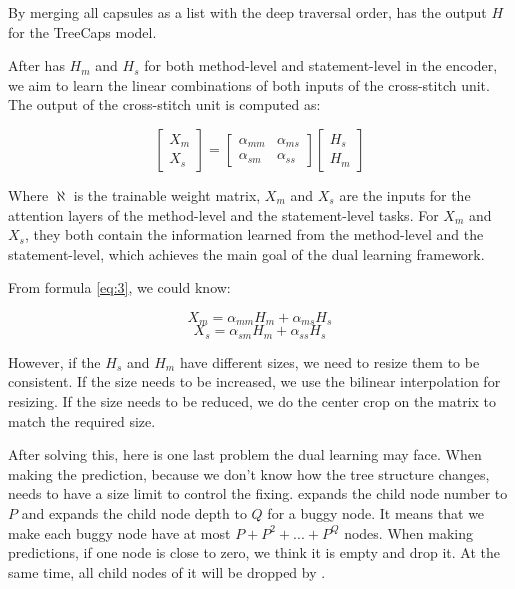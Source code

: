By merging all capsules as a list with the deep traversal order, \tool has the output $H$ for the TreeCaps model.

After \tool has $H_m$ and $H_s$ for both method-level and statement-level in the encoder, we aim to learn the linear combinations of both inputs of the cross-stitch unit. The output of the cross-stitch unit is computed as:

\begin{equation}\label{eq:3}
	\begin{bmatrix}
		X_m\\
		X_s
	\end{bmatrix}
	=
	\begin{bmatrix}
		\alpha_{mm} &  \alpha_{ms} \\
		\alpha_{sm} &  \alpha_{ss}
	\end{bmatrix}
	\begin{bmatrix}
		H_s\\
		H_m
	\end{bmatrix}
\end{equation}

Where $\aleph$ is the trainable weight matrix, $X_m$ and $X_s$ are the inputs for the attention layers of the method-level and the statement-level tasks. For $X_m$ and $X_s$, they both contain the information learned from the method-level and the statement-level, which achieves the main goal of the dual learning framework.

From formula \ref{eq:3}, we could know:

\begin{equation}\label{eq:4}
	X_m = \alpha_{mm}H_m + \alpha_{ms}H_s
\end{equation}
\begin{equation}\label{eq:5}
	X_s = \alpha_{sm}H_m + \alpha_{ss}H_s
\end{equation}

However, if the $H_s$ and $H_m$ have different sizes, we need to resize them to be consistent. If the size needs to be increased, we use the bilinear interpolation for resizing. If the size needs to be reduced, we do the center crop on the matrix to match the required size.

After solving this, here is one last problem the dual learning may face. When making the prediction, because we don't know how the tree structure changes, \tool needs to have a size limit to control the fixing. \tool expands the child node number to $P$ and expands the child node depth to $Q$ for a buggy node. It means that we make each buggy node have at most $P+P^2+...+P^Q$ nodes. When making predictions, if one node is close to zero, we think it is empty and drop it. At the same time, all child nodes of it will be dropped by \tool.